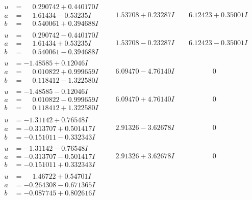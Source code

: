 \documentclass[1p]{elsarticle_modified}
\theoremstyle{definition}
\begin{document}
$$\begin{array}{c|c|c}
\begin{aligned}
u &= \phantom{-}0.290742 + 0.440170 I \\
a &= \phantom{-}1.61434 - 0.53235 I \\
b &= \phantom{-}0.540061 + 0.394688 I\end{aligned}
 & \phantom{-}1.53708 + 0.23287 I & \phantom{-}6.12423 + 0.35001 I \\ \hline\begin{aligned}
u &= \phantom{-}0.290742 - 0.440170 I \\
a &= \phantom{-}1.61434 + 0.53235 I \\
b &= \phantom{-}0.540061 - 0.394688 I\end{aligned}
 & \phantom{-}1.53708 - 0.23287 I & \phantom{-}6.12423 - 0.35001 I \\ \hline\begin{aligned}
u &= -1.48585 + 0.12046 I \\
a &= \phantom{-}0.010822 + 0.999659 I \\
b &= \phantom{-}0.118412 - 1.322580 I\end{aligned}
 & \phantom{-}6.09470 - 4.76140 I & \phantom{-0.000000 } 0 \\ \hline\begin{aligned}
u &= -1.48585 - 0.12046 I \\
a &= \phantom{-}0.010822 - 0.999659 I \\
b &= \phantom{-}0.118412 + 1.322580 I\end{aligned}
 & \phantom{-}6.09470 + 4.76140 I & \phantom{-0.000000 } 0 \\ \hline\begin{aligned}
u &= -1.31142 + 0.76548 I \\
a &= -0.313707 + 0.501417 I \\
b &= -0.151011 - 0.332343 I\end{aligned}
 & \phantom{-}2.91326 - 3.62678 I & \phantom{-0.000000 } 0 \\ \hline\begin{aligned}
u &= -1.31142 - 0.76548 I \\
a &= -0.313707 - 0.501417 I \\
b &= -0.151011 + 0.332343 I\end{aligned}
 & \phantom{-}2.91326 + 3.62678 I & \phantom{-0.000000 } 0 \\ \hline\begin{aligned}
u &= \phantom{-}1.46722 + 0.54701 I \\
a &= -0.264308 - 0.671365 I \\
b &= -0.087745 + 0.802616 I\end{aligned}

\end{array}$$
\end{document}

